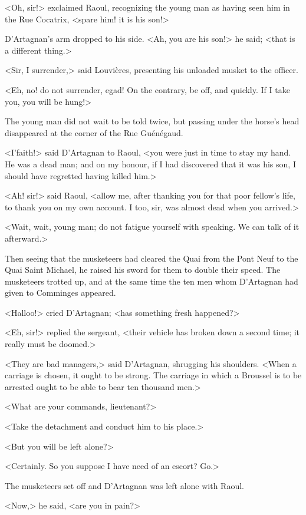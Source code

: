 <Oh, sir!> exclaimed Raoul, recognizing the young man as having seen him in the Rue Cocatrix, <spare him! it is his son!>

D'Artagnan's arm dropped to his side. <Ah, you are his son!> he said; <that is a different thing.>

<Sir, I surrender,> said Louvières, presenting his unloaded musket to the officer.

<Eh, no! do not surrender, egad! On the contrary, be off, and quickly. If I take you, you will be hung!>

The young man did not wait to be told twice, but passing under the horse's head disappeared at the corner of the Rue Guénégaud.

<I'faith!> said D'Artagnan to Raoul, <you were just in time to stay my hand. He was a dead man; and on my honour, if I had discovered that it was his son, I should have regretted having killed him.>

<Ah! sir!> said Raoul, <allow me, after thanking you for that poor fellow's life, to thank you on my own account. I too, sir, was almost dead when you arrived.>

<Wait, wait, young man; do not fatigue yourself with speaking. We can talk of it afterward.>

Then seeing that the musketeers had cleared the Quai from the Pont Neuf to the Quai Saint Michael, he raised his sword for them to double their speed. The musketeers trotted up, and at the same time the ten men whom D'Artagnan had given to Comminges appeared.

<Halloo!> cried D'Artagnan; <has something fresh happened?>

<Eh, sir!> replied the sergeant, <their vehicle has broken down a second time; it really must be doomed.>

<They are bad managers,> said D'Artagnan, shrugging his shoulders. <When a carriage is chosen, it ought to be strong. The carriage in which a Broussel is to be arrested ought to be able to bear ten thousand men.>

<What are your commands, lieutenant?>

<Take the detachment and conduct him to his place.>

<But you will be left alone?>

<Certainly. So you suppose I have need of an escort? Go.>

The musketeers set off and D'Artagnan was left alone with Raoul.

<Now,> he said, <are you in pain?>

